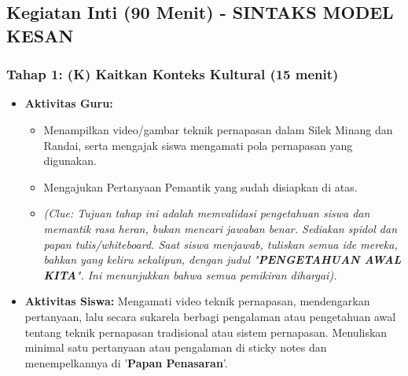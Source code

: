 \documentclass[a4paper,12pt]{article}
\begin{document}
\subsection{Kegiatan Inti (90 Menit) - SINTAKS MODEL KESAN}

\subsubsection{Tahap 1: (K) Kaitkan Konteks Kultural (15 menit)}
\begin{itemize}
\item \textbf{Aktivitas Guru:}
    \begin{itemize}
    \item Menampilkan video/gambar teknik pernapasan dalam Silek Minang dan Randai, serta mengajak siswa mengamati pola pernapasan yang digunakan.
    \item Mengajukan Pertanyaan Pemantik yang sudah disiapkan di atas.
    \item \textit{(Clue: Tujuan tahap ini adalah memvalidasi pengetahuan siswa dan memantik rasa heran, bukan mencari jawaban benar. Sediakan spidol dan papan tulis/whiteboard. Saat siswa menjawab, tuliskan semua ide mereka, bahkan yang keliru sekalipun, dengan judul "\textbf{PENGETAHUAN AWAL KITA}". Ini menunjukkan bahwa semua pemikiran dihargai).}
    \end{itemize}
\item \textbf{Aktivitas Siswa:} Mengamati video teknik pernapasan, mendengarkan pertanyaan, lalu secara sukarela berbagi pengalaman atau pengetahuan awal tentang teknik pernapasan tradisional atau sistem pernapasan. Menuliskan minimal satu pertanyaan atau pengalaman di sticky notes dan menempelkannya di '\textbf{Papan Penasaran}'.
\end{itemize}
\end{document}
